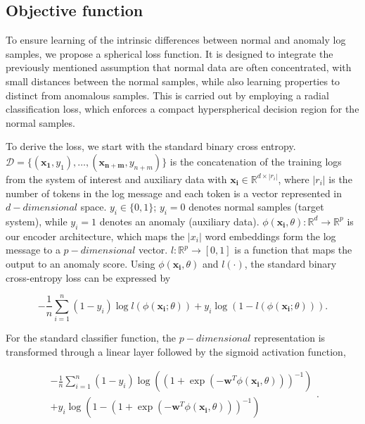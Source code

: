 \subsection{Objective function}
To ensure learning of the intrinsic differences between normal and anomaly log samples, we propose a spherical loss function. It is designed to integrate the previously mentioned assumption that normal data are often concentrated, with small distances between the normal samples, while also learning properties to distinct from anomalous samples. This is carried out by employing a radial classification loss, which enforces a compact hyperspherical decision region for the normal samples.

To derive the loss, we start with the standard binary cross entropy. $\mathcal{D}=\{(\mathbf{x_1}, y_1), \dots, (\mathbf{x_{n+m}}, y_{n+m})\}$ is the concatenation of the training logs from the system of interest and auxiliary data with $\mathbf{x_i} \in \mathbb{R}^{d\times|r_i|}$, where $|r_i|$ is the number of tokens in the log message and each token is a vector represented in $d-dimensional$ space. $y_i \in \{0,1\}$; $y_i=0$ denotes normal samples (target system), while $y_i=1$ denotes an anomaly (auxiliary data). $\phi(\mathbf{x_i}, \theta): \mathbb{R}^d \rightarrow \mathbb{R}^p$ is our encoder architecture, which maps the $|x_i|$ word embeddings form the log message to a $p-dimensional$ vector. $l:\mathbb{R}^p \rightarrow [0,1]$ is a function that maps the output to an anomaly score. Using $\phi(\mathbf{x_i}, \theta)$ and $l(\cdot)$, the standard binary cross-entropy loss can be expressed by

\begin{equation}
    - \frac{1}{n}\sum_{i=1}^{n}(1-y_i)\log l(\phi(\mathbf{x_i}; \theta)) + y_i\log (1-l(\phi(\mathbf{x_i}; \theta))).
\end{equation}\label{bce}

For the standard classifier function, the $p-dimensional$ representation is transformed through a linear layer followed by the sigmoid activation function,

\begin{equation}\begin{aligned}
    - \frac{1}{n}\sum_{i=1}^{n}(1-y_i)\log((1+\exp(-\mathbf{w}^T \phi(\mathbf{x_i}, \theta)))^{-1}) \\
    +  y_i\log(1-(1+\exp(-\mathbf{w}^T \phi(\mathbf{x_i}, \theta)))^{-1})\end{aligned}.
\end{equation}\label{bcesigmoid}

